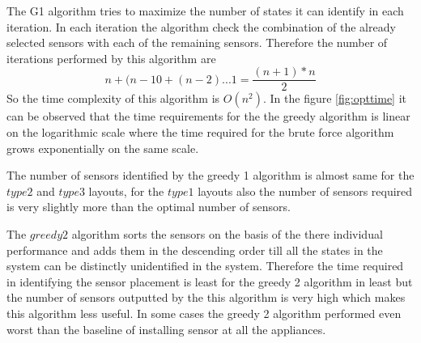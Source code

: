 The G1 algorithm tries to maximize the number of states it can identify in each iteration. In each iteration the algorithm check the combination of the already selected sensors with each of the remaining sensors. Therefore the number of iterations performed by this algorithm are
$$ n  + (n-10  + ( n-2)  ... 1 = \frac{(n +1) * n }{2}$$
So the time complexity of this algorithm is  $O(n^2)$.
In the figure \ref{fig:opttime} it can be observed that the time requirements for the the greedy algorithm is linear on the logarithmic scale where the time required for the brute force algorithm grows exponentially on the same scale.

The number of sensors identified by the greedy 1 algorithm is almost same for the $type 2$ and $type 3$ layouts, for the $type 1$ layouts also the number of sensors required is very slightly more than the optimal number of sensors.

The $greedy 2$ algorithm sorts the sensors on the basis of the there individual performance and adds them in the descending order till all the states in the system can be distinctly unidentified in the system. Therefore the time required in identifying the sensor placement is least for the greedy 2 algorithm in least but the number of sensors outputted by the this algorithm is very high which makes this algorithm less useful. In some cases the greedy 2 algorithm performed even worst than the baseline of installing sensor at all the appliances.
